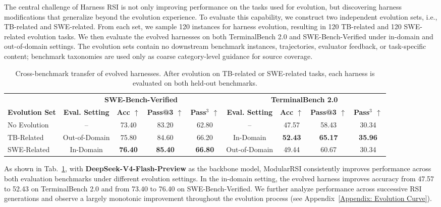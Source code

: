\documentclass{article} %
\begin{document}
The central challenge of Harness RSI is not only improving performance on the tasks used for evolution, but discovering harness modifications that generalize beyond the evolution experience. To evaluate this capability, we construct two independent evolution sets, i.e., TB-related and SWE-related. From each set, we sample 120 instances for harness evolution, resulting in 120 TB-related and 120 SWE-related evolution tasks. We then evaluate the evolved harnesses on both TerminalBench 2.0 and SWE-Bench-Verified under in-domain and out-of-domain settings. 
The evolution sets contain no downstream benchmark instances, trajectories, evaluator feedback, or task-specific content; benchmark taxonomies are used only as coarse category-level guidance for source coverage.


\begin{table}[t]
\centering
\caption{
Cross-benchmark transfer of evolved harnesses.
After evolution on TB-related or SWE-related tasks, each harness is evaluated on both held-out benchmarks.
}
\label{tab:cross_domain_generalization}

\footnotesize
\setlength{\tabcolsep}{4pt}
\begin{tabular}{lcccc|cccc}
\toprule
& \multicolumn{4}{c|}{\textbf{SWE-Bench-Verified}}
& \multicolumn{4}{c}{\textbf{TerminalBench 2.0}} \\
\cmidrule(lr){2-5}
\cmidrule(lr){6-9}

\textbf{Evolution Set}
& \textbf{Eval. Setting}
& \textbf{Acc $\uparrow$}
& \textbf{Pass@3 $\uparrow$}
& \textbf{Pass$^{3}$ $\uparrow$}
& \textbf{Eval. Setting}
& \textbf{Acc $\uparrow$}
& \textbf{Pass@3 $\uparrow$}
& \textbf{Pass$^{3}$ $\uparrow$} \\
\midrule

No Evolution
& -- & 73.40 & 83.20 & 62.80
& -- & 47.57 & 58.43 & 30.34 \\

TB-Related
& Out-of-Domain & 75.80 & 84.60 & 66.20
& In-Domain & \textbf{52.43} & \textbf{65.17} & \textbf{35.96} \\

SWE-Related
& In-Domain & \textbf{76.40} & \textbf{85.40} & \textbf{66.80}
& Out-of-Domain & 49.44 & 60.67 & 30.34 \\

\bottomrule
\end{tabular}
\end{table}


As shown in Tab.~\ref{tab:cross_domain_generalization}, with \textbf{DeepSeek-V4-Flash-Preview} as the backbone model, ModularRSI consistently improves performance across both evaluation benchmarks under different evolution settings. In the in-domain setting, the evolved harness improves accuracy from 47.57 to 52.43 on TerminalBench 2.0 and from 73.40 to 76.40 on SWE-Bench-Verified. We further analyze performance across successive RSI generations and observe a largely monotonic improvement throughout the evolution process (see Appendix~\ref{Appendix: Evolution Curve}).
\end{document}
